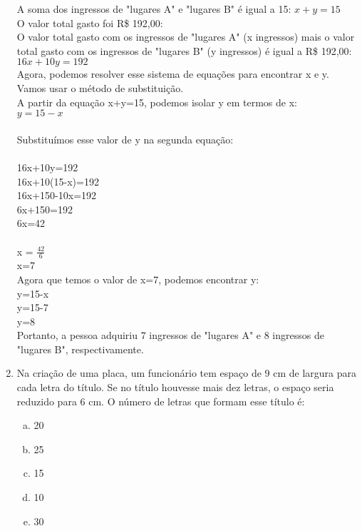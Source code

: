 \documentclass[a4paper,14pt]{article}
\begin{document}
\begin{multicols}{2}
\begin{enumerate}
        A soma dos ingressos de "lugares A" e "lugares B" é igual a 15:
        $x+y=15$\\
        
        O valor total gasto foi R\$ 192,00:\\
        O valor total gasto com os ingressos de "lugares A" (x ingressos) mais o valor total gasto com os ingressos de "lugares B" (y ingressos) é igual a R\$ 192,00:\\
        
        $16x+10y=192$\\
        
        Agora, podemos resolver esse sistema de equações para encontrar x e y. Vamos usar o método de substituição.\\
        
        A partir da equação 
        x+y=15, podemos isolar y em termos de x:\\
        $y=15-x$ \\ \\
        Substituímos esse valor de y na segunda equação:\\\\
        16x+10y=192 \\
        16x+10(15-x)=192\\
        16x+150-10x=192\\
        6x+150=192\\
        6x=42\\ \\
        x = $\frac{42}{6}$ \\
        x=7 \\
        
        Agora que temos o valor de x=7, podemos encontrar y: \\
        
        y=15-x \\
        y=15-7 \\
        y=8 \\
        
        Portanto, a pessoa adquiriu 7 ingressos de "lugares A" e 8 ingressos de "lugares B", respectivamente. 
    
        \item Na criação de uma placa, um funcionário tem espaço de 9 cm de largura para cada letra do título. Se no título houvesse mais dez letras, o espaço seria reduzido para 6 cm. O número de letras que formam esse título é:
        \begin{enumerate}[a)]
        	\item 20
        	\item 25
        	\item 15
        	\item 10
        	\item 30
        \end{enumerate}
    

\end{enumerate}
\end{multicols}
\end{document}
